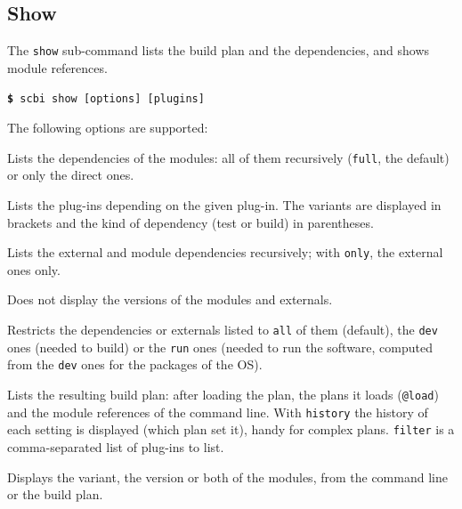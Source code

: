 \documentclass[a4paper,12pt,twoside]{article}
\newcommand{\code}[1]{\texttt{#1}}
\newcommand{\cmd}[1]{\tabto{1cm}\hspace{0.5cm}\texttt{\textbf{\$} #1}}
\newcommand{\ddash}{-{}-}
\begin{document}
\subsection{Show}
\label{listing}
\label{show}

The \code{show} sub-command lists the build plan and the dependencies, and shows module references.

\cmd{scbi show [options] [plugins]}

The following options are supported:

\begin{description}[font=\texttt]
	\item[\ddash{}depends:{[}direct|full{]}] Lists the dependencies of the modules: all of them recursively (\code{full}, the default) or only the direct ones.

	\item[\ddash{}rdepends] Lists the plug-ins depending on the given plug-in. The variants are displayed in brackets and the kind of dependency (test or build) in parentheses.

	\item[\ddash{}externals:{[}only{]}] Lists the external and module dependencies recursively; with \code{only}, the external ones only.

	\item[\ddash{}no-version] Does not display the versions of the modules and externals.

	\item[\ddash{}filter:{[}all|run|dev{]} ] Restricts the dependencies or externals listed to \code{all} of them (default), the \code{dev} ones (needed to build) or the \code{run} ones (needed to run the software, computed from the \code{dev} ones for the packages of the OS).

	\item[\ddash{}build-plan:{[}history{][}=filter{]}] Lists the resulting build plan: after loading the plan, the plans it loads (\code{@load}) and the module references of the command line. With \code{history} the history of each setting is displayed (which plan set it), handy for complex plans. \code{filter} is a comma-separated list of plug-ins to list.

	\item[\ddash{}module-ref:{[}version|variant|full{]} ] Displays the variant, the version or both of the modules, from the command line or the build plan.


\end{description}
\end{document}
